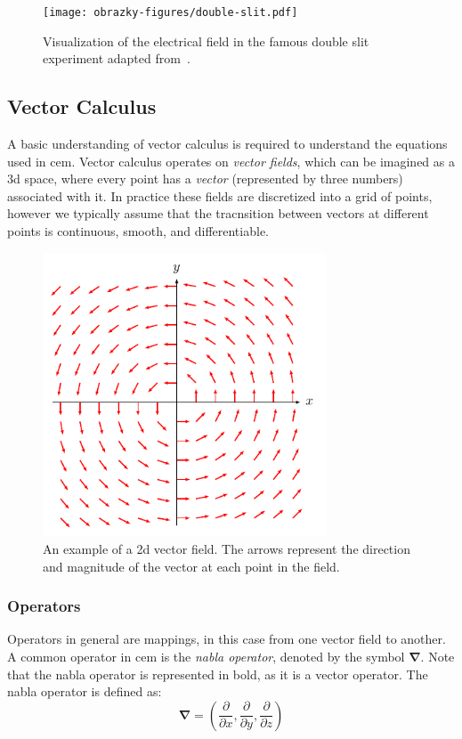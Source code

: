 \begin{figure}[H]\label{fig:double-slit}
  \centering
  \texttt{[image: obrazky-figures/double-slit.pdf]}
  \caption{Visualization of the electrical field in the famous double slit experiment adapted from~\cite{taylor_meep_double_slit}.}
\end{figure}



\subsection{Vector Calculus}
A basic understanding of vector calculus is required to understand the equations used in \gls{cem}. Vector calculus operates on \emph{vector fields}, which can be imagined as a \gls{3d} space, where every point has a \emph{vector} (represented by three numbers) associated with it. In practice these fields are discretized into a grid of points, however we typically assume that the tracnsition between vectors at different points is continuous, smooth, and differentiable. 
\begin{figure}[H]\label{fig:vector-circle}
  \centering
  \includegraphics[width=0.75\textwidth]{figures/vector-circle.pdf}
  \caption{An example of a \gls{2d} vector field. The arrows represent the direction and magnitude of the vector at each point in the field.}
\end{figure}

\subsubsection{Operators}\label{sec:operators}
Operators in general are mappings, in this case from one vector field to another. A common operator in \gls{cem} is the \emph{nabla operator}, denoted by the symbol $\pmb{\nabla}$. Note that the nabla operator is represented in bold, as it is a vector operator. The nabla operator is defined as:
\begin{equation}
  \pmb{\nabla} = \left( \frac{\partial}{\partial x}, \frac{\partial}{\partial y}, \frac{\partial}{\partial z} \right)
\end{equation} 

